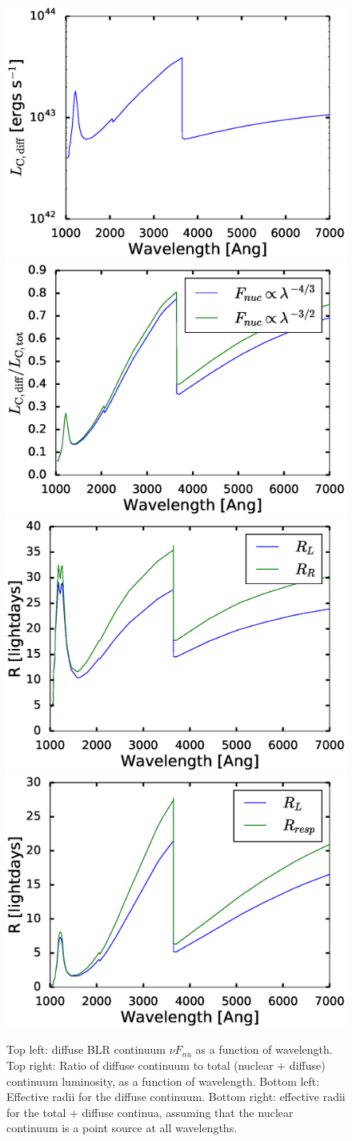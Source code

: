 \documentclass[paper=a4, fontsize=11pt]{scrartcl} %
\numberwithin{equation}{section} %
\numberwithin{figure}{section} %
\numberwithin{table}{section} %
\begin{document}
\begin{figure}
	\centering
	\includegraphics[width=0.49\linewidth]{diff_cont_lumin}
	\includegraphics[width=0.49\linewidth]{cont_frac}
	\includegraphics[width=0.49\linewidth]{diff_cont_R}
	\includegraphics[width=0.49\linewidth]{diluted_cont_R}
	\caption{Top left: diffuse BLR continuum $\nu F_{nu}$ as a function of wavelength. Top right: Ratio of diffuse continuum to total (nuclear + diffuse) continuum luminosity, as a function of wavelength. Bottom left: Effective radii for the diffuse continuum. Bottom right: effective radii for the total + diffuse continua, assuming that the nuclear continuum is a point source at all wavelengths.}
	\label{fig:cont}
\end{figure}
\end{document}
